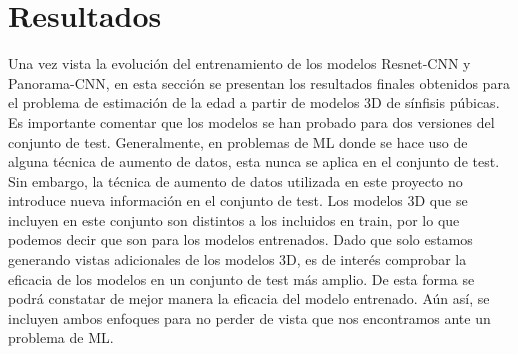\section{Resultados}

Una vez vista la evolución del entrenamiento de los modelos Resnet-CNN y Panorama-CNN, en esta sección se presentan los resultados finales obtenidos para el problema de estimación de la edad a partir de modelos 3D de sínfisis púbicas.\\

Es importante comentar que los modelos se han probado para dos versiones del conjunto de test. Generalmente, en problemas de ML donde se hace uso de alguna técnica de aumento de datos, esta nunca se aplica en el conjunto de test. Sin embargo, la técnica de aumento de datos utilizada en este proyecto no introduce nueva información en el conjunto de test. Los modelos 3D que se incluyen en este conjunto son distintos a los incluidos en train, por lo que podemos decir que son  para los modelos entrenados. Dado que solo estamos generando vistas adicionales de los modelos 3D, es de interés comprobar la eficacia de los modelos en un conjunto de test más amplio. De esta forma se podrá constatar de mejor manera la eficacia del modelo entrenado. Aún así, se incluyen ambos enfoques para no perder de vista que nos encontramos ante un problema de ML.



\newpage





\newpage
~\newpage

